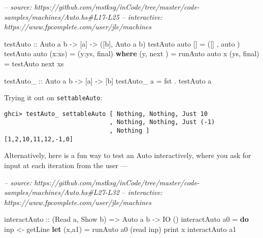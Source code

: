 \documentclass[]{article}
\newenvironment{Shaded}{}{}
\newcommand{\CommentTok}[1]{\textcolor[rgb]{0.38,0.63,0.69}{\textit{#1}}}
\newcommand{\DataTypeTok}[1]{\textcolor[rgb]{0.56,0.13,0.00}{#1}}
\newcommand{\FunctionTok}[1]{\textcolor[rgb]{0.02,0.16,0.49}{#1}}
\newcommand{\KeywordTok}[1]{\textcolor[rgb]{0.00,0.44,0.13}{\textbf{#1}}}
\newcommand{\NormalTok}[1]{#1}
\newcommand{\OtherTok}[1]{\textcolor[rgb]{0.00,0.44,0.13}{#1}}
\begin{document}
\begin{Shaded}
\begin{Highlighting}[]
\CommentTok{-- source: https://github.com/mstksg/inCode/tree/master/code-samples/machines/Auto.hs#L17-L25}
\CommentTok{-- interactive: https://www.fpcomplete.com/user/jle/machines}

\OtherTok{testAuto ::} \DataTypeTok{Auto}\NormalTok{ a b }\OtherTok{->}\NormalTok{ [a] }\OtherTok{->}\NormalTok{ ([b], }\DataTypeTok{Auto}\NormalTok{ a b)}
\NormalTok{testAuto auto []      }\FunctionTok{=}\NormalTok{ ([]  , auto )}
\NormalTok{testAuto auto (x}\FunctionTok{:}\NormalTok{xs)  }\FunctionTok{=}\NormalTok{ (y}\FunctionTok{:}\NormalTok{ys, final)}
  \KeywordTok{where}
\NormalTok{    (y,  next ) }\FunctionTok{=}\NormalTok{ runAuto  auto x}
\NormalTok{    (ys, final) }\FunctionTok{=}\NormalTok{ testAuto next xs}

\OtherTok{testAuto_ ::} \DataTypeTok{Auto}\NormalTok{ a b }\OtherTok{->}\NormalTok{ [a] }\OtherTok{->}\NormalTok{ [b]}
\NormalTok{testAuto_ a }\FunctionTok{=}\NormalTok{ fst }\FunctionTok{.}\NormalTok{ testAuto a}
\end{Highlighting}
\end{Shaded}

Trying it out on \texttt{settableAuto}:

\begin{verbatim}
ghci> testAuto_ settableAuto [ Nothing, Nothing, Just 10
                             , Nothing, Nothing, Just (-1)
                             , Nothing ]
[1,2,10,11,12,-1,0]
\end{verbatim}

Alternatively, here is a fun way to test an Auto interactively, where you ask
for input at each iteration from the user ---

\begin{Shaded}
\begin{Highlighting}[]
\CommentTok{-- source: https://github.com/mstksg/inCode/tree/master/code-samples/machines/Auto.hs#L27-L32}
\CommentTok{-- interactive: https://www.fpcomplete.com/user/jle/machines}

\OtherTok{interactAuto ::}\NormalTok{ (}\DataTypeTok{Read}\NormalTok{ a, }\DataTypeTok{Show}\NormalTok{ b) }\OtherTok{=>} \DataTypeTok{Auto}\NormalTok{ a b }\OtherTok{->} \DataTypeTok{IO}\NormalTok{ ()}
\NormalTok{interactAuto a0 }\FunctionTok{=} \KeywordTok{do}
\NormalTok{    inp }\OtherTok{<-}\NormalTok{ getLine}
    \KeywordTok{let}\NormalTok{ (x,a1) }\FunctionTok{=}\NormalTok{ runAuto a0 (read inp)}
\NormalTok{    print x}
\NormalTok{    interactAuto a1}
\end{Highlighting}
\end{Shaded}
\end{document}
